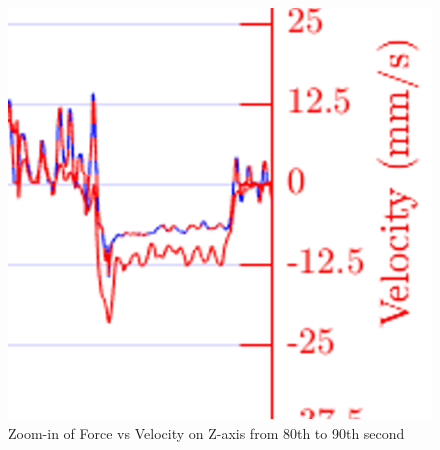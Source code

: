 \begin{figure}[htbp]
\begin{center}
\includegraphics[width=0.6\linewidth]{Images/exp/zoom_in.png}
\caption{Zoom-in of Force vs Velocity on Z-axis from 80th to 90th second}
\label{fig: zoom_in}
\end{center}
\end{figure}



